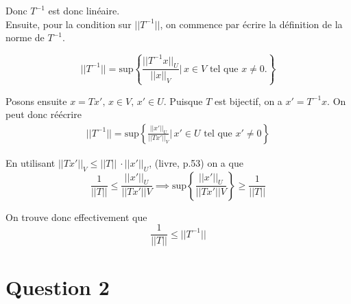 \documentclass[letterpaper,12pt,oneside,final]{book}
\begin{document}
Donc \( T^{-1}  \) est donc linéaire. \\

Ensuite, pour la condition sur \( \lvert\lvert T^{-1} \rvert\rvert  \), on commence par écrire la définition de
la norme de \( T^{-1} \). 

\begin{equation*}
    \lvert\lvert T^{-1} \rvert\rvert   = \text{sup}\left\{ \frac{\lvert\lvert T^{-1}x \rvert\rvert _{U}}{\lvert\lvert x \rvert\rvert _{V}} |\, x\in V \text{ tel que }x\neq 0.  \right\}
\end{equation*}

Posons ensuite \( x= Tx',\, x\in V, \, x' \in U\). Puisque \( T \) est bijectif, on a \( x'= T^{-1}x\). On peut donc réécrire
\begin{equation*}
\begin{split}
\lvert \lvert  T^{-1} \rvert \rvert = \text{sup}\left\{ \frac{\lvert \lvert  x' \rvert \rvert _{U}}{\lvert \lvert  Tx' \rvert \rvert_{V}} |\, x' \in U \text{ tel que } x' \neq 0 \right\} 
\end{split}
\end{equation*}

En utilisant \( \lvert \lvert  Tx' \rvert \rvert _{V} \leq \lvert \lvert  T \rvert \rvert \ \cdot \lvert \lvert  x' \rvert \rvert _{U} \), (livre, p.53) on a que 
\[ \frac{1}{\lvert \lvert  T \rvert \rvert } \leq \frac{\lvert \lvert  x' \rvert \rvert _{U}}{\lvert \lvert  Tx' \rvert \rvert V} \implies \text{sup} \left\{\frac{\lvert \lvert  x' \rvert \rvert _{U}}{\lvert \lvert  Tx' \rvert \rvert V}\right\} \geq \frac{1}{\lvert \lvert  T \rvert \rvert }  \]

On trouve donc effectivement que
\[ \frac{1}{\lvert \lvert  T \rvert \rvert } \leq \lvert \lvert  T^{-1} \rvert \rvert  \]
\newpage
\section*{Question 2}
\end{document}
